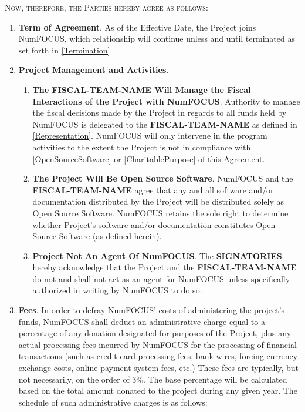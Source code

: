 \documentclass[english,letterpaper,12pt]{article}
\newcommand{\signatories}{\textbf{SIGNATORIES}}
\newcommand{\fiscalteam}{\textbf{FISCAL-TEAM-NAME}}
\begin{document}
\medskip{}

\textsc{Now, therefore, the Parties hereby agree as follows:}

\begin{enumerate}[label=\arabic*.,ref=\S~\arabic*]
\item \textbf{Term of Agreement}. As of the Effective Date, the Project
joins NumFOCUS, which relationship will continue unless and until
terminated as set forth in \ref{Termination}. 
\item \textbf{Project Management and Activities}.


\begin{enumerate}[label=\alph*.,ref=\theenumi(\alph*)]

\item \textbf{The \fiscalteam{} Will Manage the Fiscal Interactions of the
    Project with NumFOCUS}. \label{ProjectManagement} Authority to manage the
  fiscal decisions made by the Project in regards to all funds held by NumFOCUS
  is delegated to the \fiscalteam{} as defined in \ref{Representation}.
  NumFOCUS will only intervene in the program activities to the extent the
  Project is not in compliance with \ref{OpenSourceSoftware} or
  \ref{CharitablePurpose} of this Agreement.

\item \textbf{The Project Will Be Open Source
  Software}. \label{OpenSourceSoftware} NumFOCUS and the \fiscalteam{}
  agree that any and all software and/or documentation distributed by the
  Project will be distributed solely as Open Source Software.  NumFOCUS retains
  the sole right to determine whether Project's software and/or documentation
  constitutes Open Source Software (as defined herein).
  
\item \textbf{Project Not An Agent Of NumFOCUS}. The \signatories{} hereby
  acknowledge that the Project and the \fiscalteam{} do not and shall not
  act as an agent for NumFOCUS unless specifically authorized in writing by
  NumFOCUS to do so.

\end{enumerate}

\item \textbf{Fees}.  In order to defray NumFOCUS' costs of administering the
  project's funds, NumFOCUS shall deduct an administrative charge equal to a
  percentage of any donation designated for purposes of the Project, plus any
  actual processing fees incurred by NumFOCUS for the processing of financial
  transactions (such as credit card processing fees, bank wires, foreing
  currency exchange costs, online payment system fees, etc.)  These fees are
  typically, but not necessarily, on the order of 3\%. The base percentage will
  be calculated based on the total amount donated to the project during any
  given year.  The schedule of such administrative charges is as follows:


\end{enumerate}
\end{document}
